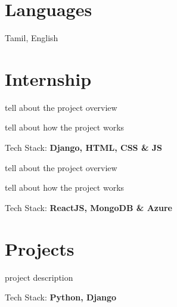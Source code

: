 \documentclass[]{deedy-resume-openfont}
\begin{document}
\begin{minipage}[t]{0.39\textwidth}
\section{Languages}
\vspace{4pt}
Tamil, English




%
%

\end{minipage} 
\hfill
\begin{minipage}[t]{0.6\textwidth} 
\section{Internship}
\vspace{8pt}
\vspace{8pt}
\begin{tightemize}
\item tell about the project overview\\
\item tell about how the project works
\item Tech Stack:{ \bf Django, HTML, CSS \& JS}

\end{tightemize}

\vspace{8pt}
\begin{tightemize}
\item tell about the project overview\\
\item tell about how the project works
\item Tech Stack:{ \bf ReactJS, MongoDB \& Azure}

\end{tightemize}



\section{Projects}
\vspace{8pt}

\vspace{4pt}
\begin{tightemize}
\item project description
\item Tech Stack: {\bf Python, Django}
\end{tightemize}
\vspace{8pt}


\end{minipage}
\end{document}
